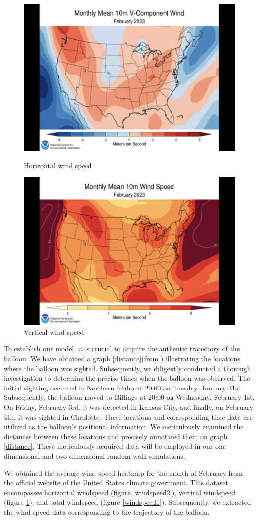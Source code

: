 \documentclass{article}
\begin{document}
\begin{multicols}{2}
\begin{figure}[ht]
\begin{minipage}{0.45\linewidth}
\centering
\includegraphics[width=0.6\linewidth]{graph/windspeed (2).png} 
\caption{Horizontal wind speed}
\label{windspeed2}
\end{minipage}
\hfill
\begin{minipage}{0.45\linewidth}
\centering
\includegraphics[width=0.6\linewidth]{graph/windspeed (3).png} 
\caption{Vertical wind speed}
\label{windspeed3}
\end{minipage}
\end{figure}

\indent\setlength{\parindent}{2em}To establish our model, it is crucial to acquire the authentic trajectory of the balloon. We have obtained a graph \ref{distance}(from \cite{Tra_data}) illustrating the locations where the balloon was sighted. Subsequently, we diligently conducted a thorough investigation to determine the precise times when the balloon was observed. The initial sighting occurred in Northern Idaho at 20:00 on Tuesday, January 31st. Subsequently, the balloon moved to Billings at 20:00 on Wednesday, February 1st. On Friday, February 3rd, it was detected in Kansas City, and finally, on February 4th, it was sighted in Charlotte. These locations and corresponding time data are utilized as the balloon's positional information. We meticulously examined the distances between these locations and precisely annotated them on graph \ref{distance}. These meticulously acquired data will be employed in our one-dimensional and two-dimensional random walk simulations.\par
\indent\setlength{\parindent}{2em}We obtained the average wind speed heatmap for the month of February from the official website of the United States climate government\cite{Wind_data}. This dataset encompasses horizontal windspeed (figure \ref{windspeed2}), vertical windspeed (figure \ref{windspeed3}), and total windspeed (figure \ref{windspeed1}). Subsequently, we extracted the wind speed data corresponding to the trajectory of the balloon.




\end{multicols}
\end{document}
